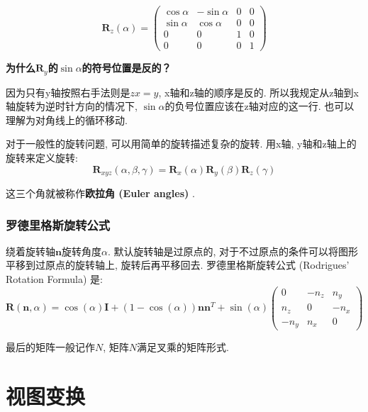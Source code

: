 \documentclass[openany]{progbookcn}
\begin{document}
\begin{equation}
	\textbf{R}_z(\alpha)=\begin{pmatrix}\cos\alpha&-\sin\alpha&0&0\\\sin\alpha&\cos\alpha&0&0\\0&0&1&0\\0&0&0&1\end{pmatrix}
\end{equation}

\begin{question}
	\textbf{为什么$\textbf{R}_y$的$\sin\alpha$的符号位置是反的？}
	
	因为只有y轴按照右手法则是$zx=y$, x轴和z轴的顺序是反的. 所以我规定从z轴到x轴旋转为逆时针方向的情况下, $\sin\alpha$的负号位置应该在z轴对应的这一行. 也可以理解为对角线上的循环移动. 
\end{question}

对于一般性的旋转问题, 可以用简单的旋转描述复杂的旋转. 用x轴, y轴和z轴上的旋转来定义旋转: 
\begin{equation}
	\textbf{R}_{xyz}(\alpha,\beta,\gamma)=\textbf{R}_x(\alpha)\textbf{R}_y(\beta)\textbf{R}_z(\gamma)
\end{equation}

这三个角就被称作\textbf{欧拉角 (Euler angles) }. 

\subsubsection{罗德里格斯旋转公式}

绕着旋转轴$\textbf{n}$旋转角度$\alpha$. 默认旋转轴是过原点的, 对于不过原点的条件可以将图形平移到过原点的旋转轴上, 旋转后再平移回去. 罗德里格斯旋转公式 (Rodrigues' Rotation Formula) 是: 
\begin{equation}
	\textbf{R}(\textbf{n},\alpha)=\cos(\alpha)\textbf{I}+(1-\cos(\alpha))\textbf{n}\textbf{n}^T+\sin(\alpha)\begin{pmatrix}0&-n_z&n_y\\n_z&0&-n_x\\-n_y&n_x&0\end{pmatrix}
\end{equation}

最后的矩阵一般记作$N$, 矩阵$N$满足叉乘的矩阵形式. 

%	
%	

\section{视图变换}
\end{document}

